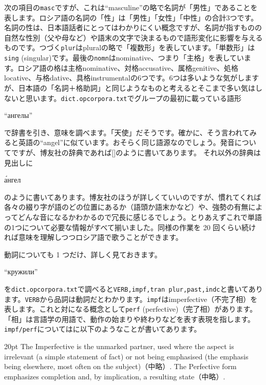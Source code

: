 \documentclass[12pt]{ltjsarticle}
\begin{document}
次の項目の\texttt{masc}ですが、これは``masculine''の略で名詞が「男性」であることを表します。ロシア語の名詞の「性」は「男性」「女性」「中性」の合計3つです。名詞の性は、日本語話者にとってはわかりにくい概念ですが、名詞が指すものの自然な性別（父や母など）や語末の文字で決まるもので語形変化に影響を与えるものです。つづく\texttt{plur}はpluralの略で「複数形」を表しています。「単数形」は\texttt{sing} (singular)です。最後の\texttt{nomn}はnominative、つまり「主格」を表しています。ロシア語の格は主格nominative、対格accusative、属格genitive、処格locative、与格dative、具格instrumentalの6つです。6つは多いような気がしますが、日本語の「名詞＋格助詞」と同じようなものと考えるとそこまで多い気はしないと思います。\texttt{dict.opcorpora.txt}でグループの最初に載っている語形\begin{russian}``ангелы''\end{russian}で辞書を引き、意味を調べます。「天使」だそうです。確かに、そう言われてみると英語の``angel''に似ています。おそらく同じ語源なのでしょう。発音についてですが、博友社の辞典であれば[]のように書いてあります。
それ以外の辞典は見出しに\begin{russian}\'{а}нгел\end{russian}のように書いてあります。博友社のほうが詳しくていいのですが、慣れてくれば各々の綴り字が語のどの位置にあるか（語頭か語末かなど）や、強勢の有無によってどんな音になるかわかるので冗長に感じるでしょう。とりあえずこれで単語の1つについて必要な情報がすべて揃いました。同様の作業を 20 回くらい続ければ意味を理解しつつロシア語で歌うことができます。

動詞についても 1 つだけ、詳しく見ておきます。\begin{russian}``кружили''\end{russian}を\texttt{dict.opcorpora.txt}で調べると\texttt{VERB,impf,tran plur,past,indc}と書いてあります。\texttt{VERB}から品詞は動詞だとわかります。\texttt{impf}はimperfective（不完了相）を表します。これと対になる概念として\texttt{perf} (perfective)（完了相）があります。
「相」は言語学の用語で、動作の始まりや終わりなどを表す表現を指します。\texttt{impf/perf}については\citep[p. 151]{cubberley2002}に以下のようなことが書いてあります。

\bigskip

\begin{indentation}{2\zw}{0pt}
The Imperfective is the unmarked partner, used where the aspect is irrelevant (a simple statement of fact) or not being emphasised (the emphasis being elsewhere, most often on the subject)（中略）. The Perfective form emphasizes completion and, by implication, a resulting state（中略）.
\end{indentation}
\end{document}
